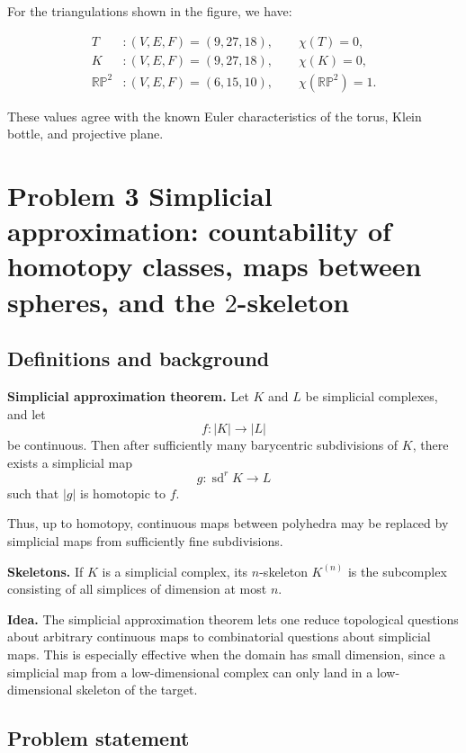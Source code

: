 \documentclass[12pt,a4paper]{article}
\theoremstyle{notespace}
\begin{document}
For the triangulations shown in the figure, we have:

\[
\boxed{
	\begin{aligned}
		T &: (V,E,F)=(9,27,18),\qquad \chi(T)=0,\\
		K &: (V,E,F)=(9,27,18),\qquad \chi(K)=0,\\
		\mathbb{RP}^2 &: (V,E,F)=(6,15,10),\qquad \chi(\mathbb{RP}^2)=1.
\end{aligned}}
\]

These values agree with the known Euler characteristics of the torus, Klein bottle, and projective plane.

\section{Problem 3 Simplicial approximation: countability of homotopy classes, maps between spheres, and the \(2\)-skeleton}

\subsection{Definitions and background}

\textbf{Simplicial approximation theorem.}
Let \(K\) and \(L\) be simplicial complexes, and let
\[
f:|K|\to |L|
\]
be continuous. Then after sufficiently many barycentric subdivisions of \(K\), there exists a simplicial map
\[
g:\operatorname{sd}^r K \to L
\]
such that \(|g|\) is homotopic to \(f\).

Thus, up to homotopy, continuous maps between polyhedra may be replaced by simplicial maps from sufficiently fine subdivisions.

\medskip

\textbf{Skeletons.}
If \(K\) is a simplicial complex, its \(n\)-skeleton \(K^{(n)}\) is the subcomplex consisting of all simplices of dimension at most \(n\).

\medskip

\textbf{Idea.}
The simplicial approximation theorem lets one reduce topological questions about arbitrary continuous maps to combinatorial questions about simplicial maps. This is especially effective when the domain has small dimension, since a simplicial map from a low-dimensional complex can only land in a low-dimensional skeleton of the target.

\subsection{Problem statement}
\end{document}
